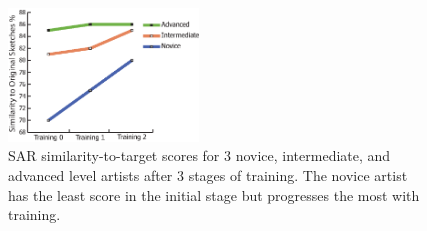 









\vspace{-3mm}
\begin{figure}[ht]
\centering
\includegraphics[width = 0.45\textwidth]{images/TrainingProgress}
\vspace{-2mm}\caption {SAR similarity-to-target scores for 3 novice, intermediate, and advanced level artists after 3 stages of training. The novice artist has the least score in the initial stage but progresses the most with training.}
\label{TrainingProgress} \vspace{-1mm}
\end{figure}


